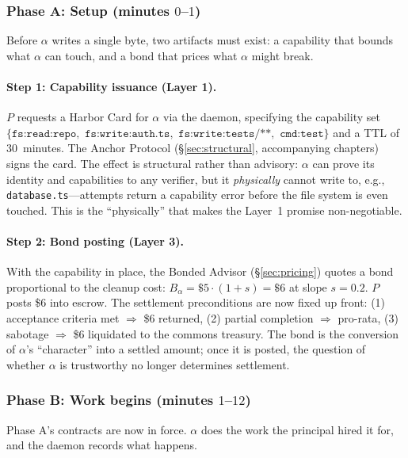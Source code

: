 \documentclass[11pt,a4paper]{article}
\theoremstyle{definition}
\theoremstyle{remark}
\begin{document}


\subsubsection*{Phase A: Setup (minutes $0$--$1$)}

Before $\alpha$ writes a single byte, two artifacts must exist: a capability that bounds what $\alpha$ can touch, and a bond that prices what $\alpha$ might break.

\paragraph{Step 1: Capability issuance (Layer 1).} $P$ requests a Harbor Card for $\alpha$ via the daemon, specifying the capability set $\{\texttt{fs:read:repo},$ $\texttt{fs:write:auth.ts},$ $\texttt{fs:write:tests/**},$ $\texttt{cmd:test}\}$ and a TTL of $30$~minutes. The Anchor Protocol (\S\ref{sec:structural}, accompanying chapters) signs the card. The effect is structural rather than advisory: $\alpha$ can prove its identity and capabilities to any verifier, but it \emph{physically} cannot write to, e.g., \texttt{database.ts}---attempts return a capability error before the file system is even touched. This is the ``physically'' that makes the Layer~1 promise non-negotiable.

\paragraph{Step 2: Bond posting (Layer 3).} With the capability in place, the Bonded Advisor (\S\ref{sec:pricing}) quotes a bond proportional to the cleanup cost: $B_\alpha = \$5 \cdot (1 + s) = \$6$ at slope $s = 0.2$. $P$ posts \$6 into escrow. The settlement preconditions are now fixed up front: (1) acceptance criteria met $\Rightarrow$ \$6 returned, (2) partial completion $\Rightarrow$ pro-rata, (3) sabotage $\Rightarrow$ \$6 liquidated to the commons treasury. The bond is the conversion of $\alpha$'s ``character'' into a settled amount; once it is posted, the question of whether $\alpha$ is trustworthy no longer determines settlement.

\subsubsection*{Phase B: Work begins (minutes $1$--$12$)}

Phase A's contracts are now in force. $\alpha$ does the work the principal hired it for, and the daemon records what happens.
\end{document}
